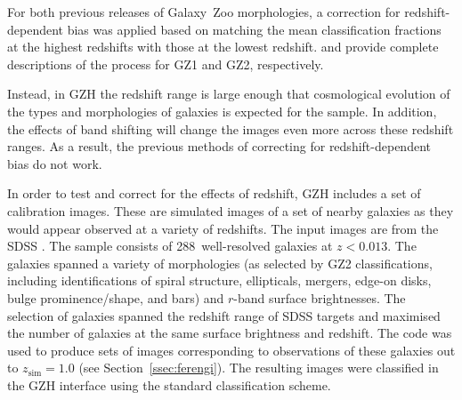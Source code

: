 \documentclass[a4paper,fleqn,usenatbib]{mnras}
\begin{document}
For both previous releases of Galaxy~Zoo morphologies, a correction for
redshift-dependent bias was applied based on matching the mean classification
fractions at the highest redshifts with those at the lowest redshift.
\citet{bam09} and \citet{wil13} provide complete descriptions of the process
for GZ1 and GZ2, respectively.

Instead, in GZH the redshift range is large enough that cosmological evolution of the
types and morphologies of galaxies is expected for the \hst{} sample. In
addition, the effects of band shifting will change the images even more across
these redshift ranges. As a result, the previous methods of correcting for
redshift-dependent bias do not work.  

In order to test and correct for the effects of redshift, GZH includes a set of
calibration images.  These are simulated images of a set of nearby galaxies as
they would appear observed at a variety of redshifts.  The input images are
from the SDSS \citep{yor00,str02}.  The sample consists of 288~well-resolved
galaxies at $z<0.013$. The galaxies spanned a variety of morphologies (as
selected by GZ2 classifications, including identifications of spiral structure,
ellipticals, mergers, edge-on disks, bulge prominence/shape, and bars) and
$r$-band surface brightnesses.  The selection of galaxies spanned the redshift
range of SDSS targets and maximised the number of \hst{} galaxies at the same
surface brightness and redshift. The \ferengi{} code was used to produce sets
of images corresponding to observations of these galaxies out to
$z_\mathrm{sim}=1.0$ (see Section~\ref{ssec:ferengi}). The resulting images
were classified in the GZH interface using the standard classification scheme. 

\end{document}
